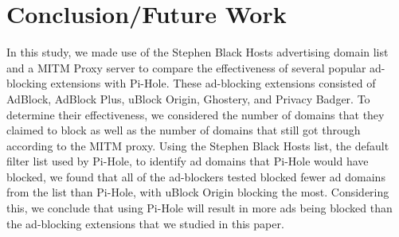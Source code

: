 \documentclass[sigsmall]{acmart}
\begin{document}
\section*{Conclusion/Future Work}
In this study, we made use of the Stephen Black Hosts advertising domain list and a MITM Proxy server to compare the effectiveness of several popular ad-blocking extensions with Pi-Hole. These ad-blocking extensions consisted of AdBlock, AdBlock Plus, uBlock Origin, Ghostery, and Privacy Badger. To determine their effectiveness, we considered the number of domains that they claimed to block as well as the number of domains that still got through according to the MITM proxy. Using the Stephen Black Hosts list, the default filter list used by Pi-Hole, to identify ad domains that Pi-Hole would have blocked, we found that all of the ad-blockers tested blocked fewer ad domains from the list than Pi-Hole, with uBlock Origin blocking the most. Considering this, we conclude that using Pi-Hole will result in more ads being blocked than the ad-blocking extensions that we studied in this paper.



\end{document}
